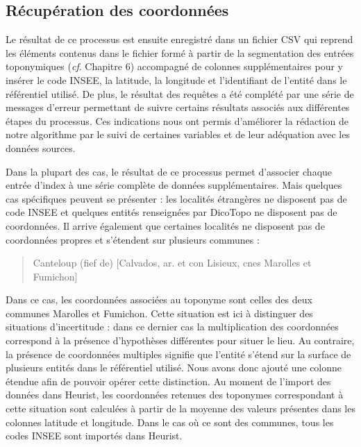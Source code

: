 \documentclass[a4paper,12pt,twoside]{book}
\begin{document}
	\subsection{Récupération des coordonnées}
	
	Le résultat de ce processus est ensuite enregistré dans un fichier CSV qui reprend les éléments contenus dans le fichier formé à partir de la segmentation des entrées toponymiques (\textit{cf}. Chapitre 6) accompagné de colonnes supplémentaires pour y insérer le code INSEE, la latitude, la longitude et l'identifiant de l'entité dans le référentiel utilisé. De plus, le résultat des requêtes a été complété par une série de messages d'erreur permettant de suivre certains résultats associés aux différentes étapes du processus. Ces indications nous ont permis d'améliorer la rédaction de notre algorithme par le suivi de certaines variables et de leur adéquation avec les données sources.
	
	Dans la plupart des cas, le résultat de ce processus permet d'associer chaque entrée d'index à une série complète de données supplémentaires. Mais quelques cas spécifiques peuvent se présenter : les localités étrangères ne disposent pas de code INSEE et quelques entités renseignées par DicoTopo ne disposent pas de coordonnées. Il arrive également que certaines localités ne disposent pas de coordonnées propres et s'étendent sur plusieurs communes :
	
	\begin{quotation}
		Canteloup (fief de) [Calvados, ar. et con Lisieux, cnes Marolles et Fumichon]
	\end{quotation}

	Dans ce cas, les coordonnées associées au toponyme sont celles des deux communes Marolles et Fumichon. Cette situation est ici à distinguer des situations d'incertitude : dans ce dernier cas la multiplication des coordonnées correspond à la présence d'hypothèses différentes pour situer le lieu. Au contraire, la présence de coordonnées multiples signifie que l'entité s'étend sur la surface de plusieurs entités dans le référentiel utilisé. Nous avons donc ajouté une colonne \og étendue\fg{} afin de pouvoir opérer cette distinction. Au moment de l'import des données dans Heurist, les coordonnées retenues des toponymes correspondant à cette situation sont calculées à partir de la moyenne des valeurs présentes dans les colonnes \og latitude\fg{} et \og longitude\fg{}. Dans le cas où ce sont des communes, tous les codes INSEE sont importés dans Heurist.
	
\end{document}
